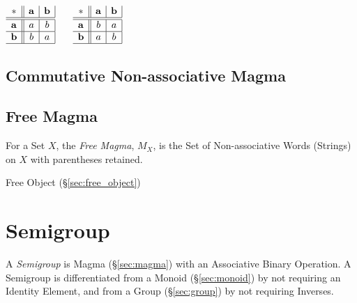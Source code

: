 $\begin{array}{c||c|c|}
  * & \mathbf{a} & \mathbf{b} \\ \hline \hline
  \mathbf{a} & a & b \\ \hline
  \mathbf{b} & b & a \\ \hline
\end{array}$ $\quad$ $\begin{array}{c||c|c|}
  * & \mathbf{a} & \mathbf{b} \\ \hline \hline
  \mathbf{a} & b & a \\ \hline
  \mathbf{b} & a & b \\ \hline
\end{array}$



\subsection{Commutative Non-associative Magma}
\label{sec:commutative_magma}

\subsection{Free Magma}\label{sec:free_magma}

For a Set $X$, the \emph{Free Magma}, $M_X$, is the Set of
Non-associative Words (Strings) on $X$ with parentheses retained.

Free Object (\S\ref{sec:free_object})



\section{Semigroup}\label{sec:semigroup}

A \emph{Semigroup} is Magma (\S\ref{sec:magma}) with an Associative Binary
Operation. A Semigroup is differentiated from a Monoid (\S\ref{sec:monoid}) by
not requiring an Identity Element, and from a Group (\S\ref{sec:group}) by not
requiring Inverses.



